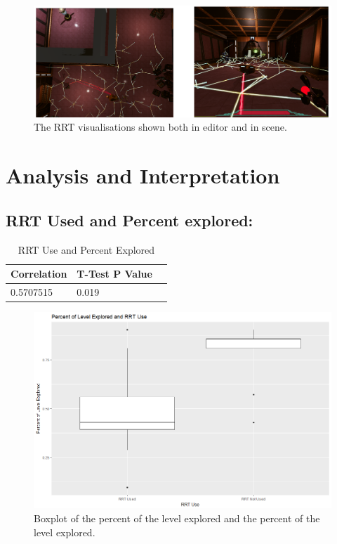 \documentclass[journal]{IEEEtran}
\begin{document}
\begin{figure}[h]
	\includegraphics[width=1.0\linewidth]{RRTVis.png}
	\caption{The RRT visualisations shown both in editor and in scene.}
	\label{image:RRTVisuals}
\end{figure}  

\section{Analysis and Interpretation}


\subsection{RRT Used and Percent explored:}
\begin{table}[H]
	\centering
	\caption{RRT Use and Percent Explored}
	\label{table:RRTPercent}
	\def\arraystretch{1.5}
	\begin{tabular}{ |l|l|l|}
		\hline
		\textbf{Correlation}& \textbf{T-Test P Value} \\
		\hline
		0.5707515	& 0.019 \\
		\hline
	\end{tabular}
\end{table}

\begin{figure}[h]
	\includegraphics[width=1.0\linewidth]{BoxPlot_RRTUsePercent.png}
	\caption{Boxplot of the percent of the level explored and the percent of the level explored.}
	\label{graph:BoxPlot_RRTUsePercent}
\end{figure} 
\end{document}
